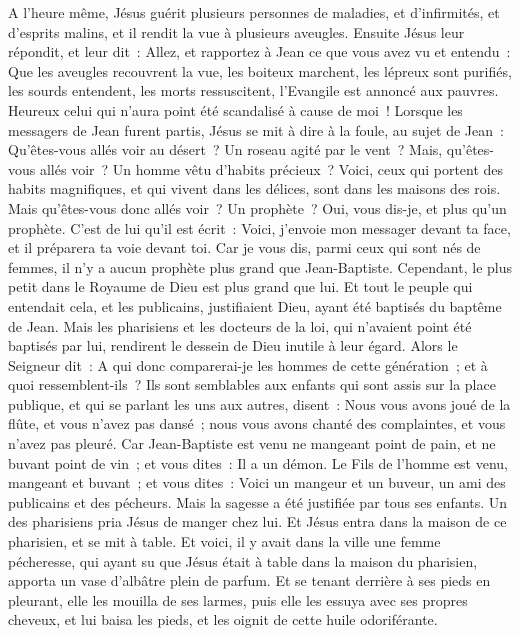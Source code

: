 \begin{multicols}{2}
A l'heure même, Jésus guérit plusieurs personnes de maladies, et d'infirmités, et d'esprits malins, et il rendit la vue à plusieurs aveugles.
Ensuite Jésus leur répondit, et leur dit~: Allez, et rapportez à Jean ce que vous avez vu et entendu~: Que les aveugles recouvrent la vue, les boiteux marchent, les lépreux sont purifiés, les sourds entendent, les morts ressuscitent, l'Evangile est annoncé aux pauvres.
Heureux celui qui n'aura point été scandalisé à cause de moi~!
Lorsque les messagers de Jean furent partis, Jésus se mit à dire à la foule, au sujet de Jean~: Qu'êtes-vous allés voir au désert~? Un roseau agité par le vent~?
Mais, qu'êtes-vous allés voir~? Un homme vêtu d'habits précieux~? Voici, ceux qui portent des habits magnifiques, et qui vivent dans les délices, sont dans les maisons des rois.
Mais qu'êtes-vous donc allés voir~? Un prophète~? Oui, vous dis-je, et plus qu'un prophète.
C'est de lui qu'il est écrit~: Voici, j'envoie mon messager devant ta face, et il préparera ta voie devant toi.
Car je vous dis, parmi ceux qui sont nés de femmes, il n'y a aucun prophète plus grand que Jean-Baptiste. Cependant, le plus petit dans le Royaume de Dieu est plus grand que lui.
Et tout le peuple qui entendait cela, et les publicains, justifiaient Dieu, ayant été baptisés du baptême de Jean.
Mais les pharisiens et les docteurs de la loi, qui n'avaient point été baptisés par lui, rendirent le dessein de Dieu inutile à leur égard.
Alors le Seigneur dit~: A qui donc comparerai-je les hommes de cette génération~; et à quoi ressemblent-ils~?
Ils sont semblables aux enfants qui sont assis sur la place publique, et qui se parlant les uns aux autres, disent~: Nous vous avons joué de la flûte, et vous n'avez pas dansé~; nous vous avons chanté des complaintes, et vous n'avez pas pleuré.
Car Jean-Baptiste est venu ne mangeant point de pain, et ne buvant point de vin~; et vous dites~: Il a un démon.
Le Fils de l'homme est venu, mangeant et buvant~; et vous dites~: Voici un mangeur et un buveur, un ami des publicains et des pécheurs.
Mais la sagesse a été justifiée par tous ses enfants.
Un des pharisiens pria Jésus de manger chez lui. Et Jésus entra dans la maison de ce pharisien, et se mit à table.
Et voici, il y avait dans la ville une femme pécheresse, qui ayant su que Jésus était à table dans la maison du pharisien, apporta un vase d'albâtre plein de parfum.
Et se tenant derrière à ses pieds en pleurant, elle les mouilla de ses larmes, puis elle les essuya avec ses propres cheveux, et lui baisa les pieds, et les oignit de cette huile odoriférante.

\end{multicols}
